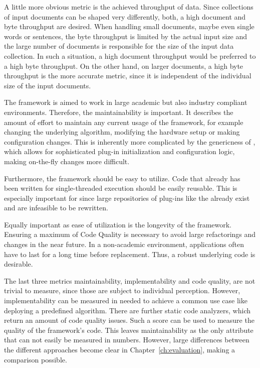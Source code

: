 A little more obvious metric is the achieved throughput of data. Since collections of input documents can be shaped very differently, both, a high document and byte throughput are desired. When handling small documents, maybe even single words or sentences, the byte throughput is limited by the actual input size and the large number of documents is responsible for the size of the input data collection. In such a situation, a high document throughput would be preferred to a high byte throughput. On the other hand, on larger documents, a high byte throughput is the more accurate metric, since it is independent of the individual size of the input documents.

The framework is aimed to work in large academic but also industry compliant environments. Therefore, the maintainability is important. It describes the amount of effort to maintain any current usage of the framework, for example changing the underlying \nlp{} algorithm, modifying the hardware setup or making configuration changes. This is inherently more complicated by the genericness of \uima{}, which allows for sophisticated plug-in initialization and configuration logic, making on-the-fly changes more difficult.

Furthermore, the framework should be easy to utilize. Code that already has been written for single-threaded execution should be easily reusable. This is especially important for \uima{} since large repositories of plug-ins like the \dkpro{} \cite{dkpro} already exist and are infeasible to be rewritten. 

Equally important as ease of utilization is the longevity of the framework. Ensuring a maximum of Code Quality is necessary to avoid large refactorings and \api{} changes in the near future. In a non-academic environment, applications often have to last for a long time before replacement. Thus, a robust underlying code is desirable.

The last three metrics maintainability, implementability and code quality, are not trivial to measure, since those are subject to individual perception. However, implementability can be measured in \loc{} needed to achieve a common use case like deploying a predefined \nlp{} algorithm. There are further static code analyzers, which return an amount of code quality issues. Such a score can be used to measure the quality of the framework's code. This leaves maintainability as the only attribute that can not easily be measured in numbers. However, large differences between the different approaches become clear in Chapter~\ref{ch:evaluation}, making a comparison possible.

